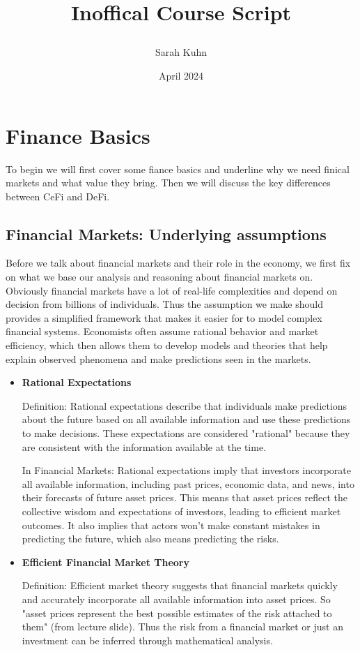 \documentclass{article}
\title{%
  \large {Inoffical Course Script}
\author{Sarah Kuhn}
\date{April 2024}
}
\begin{document}
\maketitle
\thispagestyle{empty} %

\newpage
{} %
\setcounter{page}{1} %

\section{Finance Basics}
To begin we will first cover some fiance basics and underline why we need finical markets and what value they bring. Then we will discuss the key differences between CeFi and DeFi.
\subsection{Financial Markets: Underlying assumptions} 
Before we  talk about financial markets and their role in the economy, we first fix on what we base our analysis and reasoning about financial markets on. Obviously financial markets have a lot of real-life complexities and depend on decision from billions of individuals. Thus the assumption we make should provides a simplified framework that makes it easier for  to model complex financial systems. Economists often assume rational behavior and market efficiency, which then allows them to develop models and theories that help explain observed phenomena and make predictions seen in the markets.
\begin{itemize}
    \item \textbf{Rational Expectations}

Definition: Rational expectations describe that individuals make predictions about the future based on all available information and use these predictions to make decisions. These expectations are considered "rational" because they are consistent with the information available at the time.

In Financial Markets: Rational expectations imply that investors incorporate all available information, including past prices, economic data, and news, into their forecasts of future asset prices. This means that asset prices reflect the collective wisdom and expectations of investors, leading to efficient market outcomes. It also implies that actors won't make constant mistakes in predicting the future, which also means predicting the risks. 

    \item \textbf{Efficient Financial Market Theory}

    Definition: Efficient market theory suggests that financial markets quickly and accurately incorporate all available information into asset prices. So "asset prices represent the best possible estimates of the risk attached to them" (from lecture slide). Thus the risk from a financial market or just an investment can be inferred through mathematical analysis.

    \end{itemize}
\end{document}
